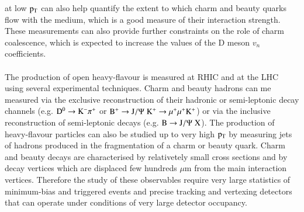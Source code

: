 \documentclass{webofc}
\begin{document}
at low $\rm p_{\rm T} $ can also help quantify the extent to which charm and beauty quarks flow with the medium, 
which is a good measure of their interaction strength. These measurements can also provide further constraints on the role of charm 
coalescence, which is expected to increase the values of the D meson $v_{n}$ coefficients.
\\ \\
The production of open heavy-flavour is measured at RHIC and at the LHC using several experimental techniques. Charm and beauty hadrons can me measured via the exclusive reconstruction 
of their hadronic or semi-leptonic decay channels (e.g. $\rm D^{0} \rightarrow K^{-} \pi^{+}$ or $\rm \rm B^{+} \rightarrow J/\Psi \hspace{0.1cm} K^{+} \rightarrow \mu^{+} \mu^{+} K^{+}$) or via the inclusive reconstruction of semi-leptonic decays (e.g. $\rm B \rightarrow J/\Psi \hspace{0.1cm} X$). The production of 
heavy-flavour particles can also be studied up to very high $\rm p_{\rm T} $ by measuring jets of hadrons produced in the fragmentation of a charm or beauty quark.  Charm and beauty decays are 
characterised by relativetely small cross sections and by decay vertices which are displaced few hundreds $\mu$m from the main interaction vertices.
Therefore the study of these observables require very large statistics of minimum-bias and triggered events 
and precise tracking and vertexing detectors that can operate under conditions of very large detector occupancy. 
\end{document}
